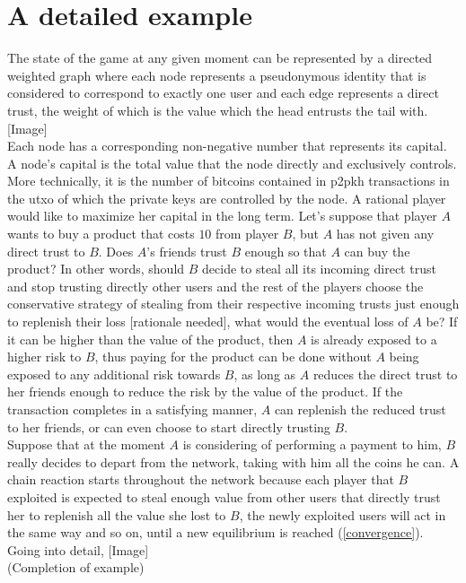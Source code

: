 \documentclass[11pt]{llncs}
\begin{document}
     
  \section{A detailed example}
     The state of the game at any given moment can be represented by a directed weighted graph where each node represents a
     pseudonymous identity that is considered to correspond to exactly one user and each edge represents a direct trust, the
     weight of which is the value which the head entrusts the tail with. [Image] \\
     Each node has a corresponding non-negative number that represents its capital. A node's capital is the total value that
     the node directly and exclusively controls. More technically, it is the number of bitcoins contained in p2pkh
     transactions in the utxo of which the private keys are controlled by the node. A rational player would like to maximize
     her capital in the long term. Let's suppose that player $A$ wants to buy a product that costs $10$ from player $B$, but
     $A$ has not given any direct trust to $B$. Does $A$'s friends trust $B$ enough so that $A$ can buy the product? In other
     words, should $B$ decide to steal all its incoming direct trust and stop trusting directly other users and the rest of
     the players choose the conservative strategy of stealing from their respective incoming trusts just enough to replenish
     their loss [rationale needed], what would the eventual loss of $A$ be? If it can be higher than the value of the
     product, then $A$ is already exposed to a higher risk to $B$, thus paying for the product can be done without $A$ being
     exposed to any additional risk towards $B$, as long as $A$ reduces the direct trust to her friends enough to reduce the
     risk by the value of the product. If the transaction completes in a satisfying manner, $A$ can replenish the reduced
     trust to her friends, or can even choose to start directly trusting $B$. \\
     Suppose that at the moment $A$ is considering of performing a payment to him, $B$ really decides to depart from the
     network, taking with him all the coins he can. A chain reaction starts throughout the network because each player that
     $B$ exploited is expected to steal enough value from other users that directly trust her to replenish all the value she
     lost to $B$, the newly exploited users will act in the same way and so on, until a new equilibrium is reached
     (\ref{convergence}). Going into detail, [Image] \\
     (Completion of example)
\end{document}
